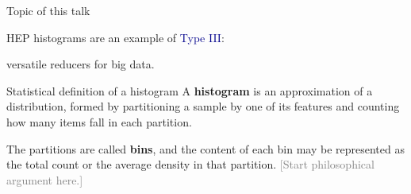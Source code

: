 \documentclass[aspectratio=169]{beamer}
\begin{document}
\begin{frame}{Topic of this talk}
\begin{center}
\Large HEP histograms are an example of \textcolor{darkblue}{Type III}:

\vspace{0.5 cm}
versatile reducers for big data.
\end{center}
\end{frame}

\begin{frame}{Statistical definition of a histogram}
\vspace{0.75 cm}
A {\bf histogram} is an approximation of a distribution, formed by partitioning a sample by one of its features and counting how many items fall in each partition.

\vspace{0.25 cm}
The partitions are called {\bf bins}, and the content of each bin may be represented as the total count or the average density in that partition. \textcolor{gray}{[Start philosophical argument here.]}

\begin{center}
\end{center}
\end{frame}
\end{document}

